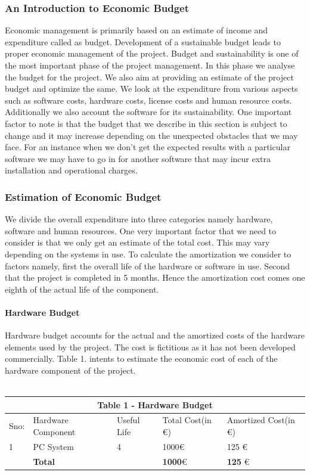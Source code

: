 \subsubsection{An Introduction to Economic Budget}
Economic management is primarily based on an estimate of income and expenditure called as
budget. Development of a sustainable budget leads to proper economic management of the
project. Budget and sustainability is one of the most important phase of the project
management. In this phase we analyse the budget for the project. We also aim at providing an
estimate of the project budget and optimize the same. We look at the expenditure from various
aspects such as software costs, hardware costs, license costs and human resource costs.
Additionally we also account the software for its sustainability. One important factor to note is
that the budget that we describe in this section is subject to change and it may increase
depending on the unexpected obstacles that we may face. For an instance when we don’t get
the expected results with a particular software we may have to go in for another software that
may incur extra installation and operational charges.
\subsubsection{Estimation of Economic Budget}
We divide the overall expenditure into three categories namely hardware, software and human
resources. One very important factor that we need to consider is that we only get an estimate
of the total cost. This may vary depending on the systems in use. To calculate the amortization
we consider to factors namely, first the overall life of the hardware or software in use. Second
that the project is completed in 5 months. Hence the amortization cost comes one eighth
of the actual life of the component.\\

\paragraph{Hardware Budget} Hardware budget accounts for the actual and the amortized costs of the hardware elements
used by the project. The cost is fictitious as it has not been developed commercially. Table 1.
intents to estimate the economic cost of each of the hardware component of the project.
\\\\
\begin{tabular}{|p{1cm}||p{3cm}|p{2cm}|p{3cm}|p{3cm}|}
 \hline
 \multicolumn{5}{|c|}{Table 1 - Hardware Budget} \\
 \hline
 Sno: & Hardware Component&Useful Life &Total Cost(in \euro) &Amortized Cost(in \euro)\\
 \hline
1   & PC System  &4 &  1000\euro  & 125 \euro \\
\hline
\hline
   & \textbf{Total}  &  &  \textbf{1000}\euro  & \textbf{125} \euro \\
 \hline

\end{tabular}

